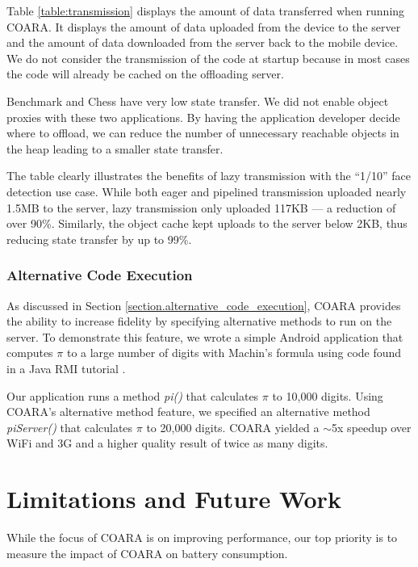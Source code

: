 \documentclass[10pt,journal,cspaper,compsoc]{IEEEtran}
\begin{document}
{Table \ref{table:transmission} displays the amount of data transferred when running COARA.  It displays the amount of data uploaded from the device to the server and the amount of data downloaded from the server back to the mobile device.  We do not consider the transmission of the code at startup because in most cases the code will already be cached on the offloading server.

Benchmark and Chess have very low state transfer.  We did not enable object proxies with these two applications.  By having the application developer decide where to offload, we can reduce the number of unnecessary reachable objects in the heap leading to a smaller state transfer.

The table clearly illustrates the benefits of lazy transmission with the ``1/10'' face detection use case.  While both eager and pipelined transmission uploaded nearly 1.5MB to the server, lazy transmission only uploaded 117KB --- a reduction of over 90\%.  Similarly, the object cache kept uploads to the server below 2KB, thus reducing state transfer by up to 99\%.



\subsubsection{Alternative Code Execution}


As discussed in Section \ref{section.alternative_code_execution}, COARA provides the ability to increase fidelity by specifying alternative methods to run on the server.  To demonstrate this feature, we wrote a simple Android application that computes $\pi$ to a large number of digits with Machin's formula using code found in a Java RMI tutorial \cite{pi:Online}.

Our application runs a method \emph{pi()} that calculates $\pi$ to 10,000 digits.  Using COARA's alternative method feature, we specified an alternative method \emph{piServer()} that calculates $\pi$ to 20,000 digits.  COARA yielded a $\sim$5x speedup over WiFi and 3G and a higher quality result of twice as many digits.




\section{Limitations and Future Work}
\label{sec:limits}


While the focus of COARA is on improving performance, our top priority is to measure the impact of COARA on battery consumption.

}
\end{document}
